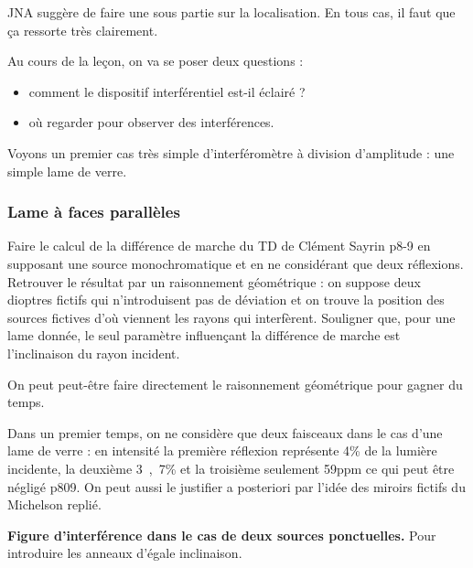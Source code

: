 \begin{remarque}
\important
JNA suggère de faire une sous partie sur la localisation.
En tous cas, il faut que ça ressorte très clairement.
\end{remarque}

Au cours de la leçon, on va se poser deux questions :
\begin{itemize}
\item comment le dispositif interférentiel est-il éclairé ?
\item où regarder pour observer des interférences.
\end{itemize}

\begin{transition}
Voyons un premier cas très simple d'interféromètre à division d'amplitude : une simple lame de verre.
\end{transition}

\subsubsection{Lame à faces parallèles}

Faire le calcul de la différence de marche du TD de Clément Sayrin p8-9 en supposant une source monochromatique et en ne considérant que deux réflexions. 
Retrouver le résultat par un raisonnement géométrique : on suppose deux dioptres fictifs qui n'introduisent pas de déviation et on trouve la position des sources fictives d'où viennent les rayons qui interfèrent.
Souligner que, pour une lame donnée, le seul paramètre influençant la différence de marche est l'inclinaison du rayon incident.
\begin{remarque}
On peut peut-être faire directement le raisonnement géométrique pour gagner du temps. 

\noindent
Dans un premier temps, on ne considère que deux faisceaux dans le cas d'une lame de verre : en intensité la première réflexion représente \unit{4}{\%} de la lumière incidente, la deuxième \unit{3{,}7}{\%} et la troisième seulement \unit{59}{ppm} ce qui peut être négligé \cite{Olivier2000} p809.
On peut aussi le justifier a posteriori par l'idée des miroirs fictifs du Michelson replié.
\end{remarque}

\begin{slide}
\textbf{Figure d'interférence dans le cas de deux sources ponctuelles.}
Pour introduire les anneaux d'égale inclinaison.
\end{slide}

